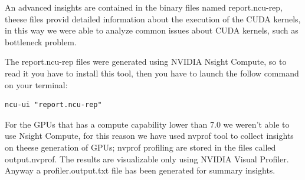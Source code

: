 An advanced insights are contained in the binary files named report.ncu-rep, theese files provid detailed information about the execution of the CUDA kernels, in this way we were able to analyze common issues about CUDA kernels, such as bottleneck problem.

The report.ncu-rep files were generated using NVIDIA Nsight Compute, so to read it you have to install this tool, then you have to launch the follow command on your terminal:

\begin{lstlisting}[basicstyle=\ttfamily\footnotesize\color{white}, backgroundcolor=\color{black}, keywordstyle=\color{white}, stringstyle=\color{white}, identifierstyle=\color{white}]
    ncu-ui "report.ncu-rep"
\end{lstlisting}





For the GPUs that has a compute capability lower than 7.0 we weren't able to use Nsight Compute, for this reason we have used nvprof tool to collect insights on theese generation of GPUs; nvprof profiling are stored in the files called output.nvprof.
The results are visualizable only using NVIDIA Visual Profiler. Anyway a profiler.output.txt file has been generated for summary insights.



